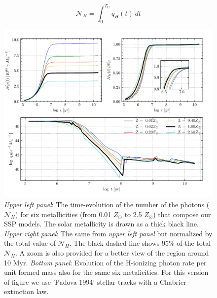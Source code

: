 \documentclass[12pt,letterpaper,usenatbib,useAMS]{article}
\begin{document}
\begin{equation}
	\mathcal{N}_H = \int_0^{T_U} q_H(t)\ dt
\end{equation}
\begin{figure}
    \includegraphics[width=\textwidth]{figs/Nh_logt_metBase_Padova1994_chab.pdf}
    \caption{\emph{Upper left panel}: The time-evolution of the number of the photons ($\mathcal{N}_H$) for six metallicities (from 0.01 $Z_\odot$ to 2.5 $Z_\odot$) that compose our SSP models. The solar metallicity is drawn as a thick black line. \emph{Upper right panel}: The same from \emph{upper left panel} but normalized by the total value of $\mathcal{N}_H$. The black dashed line shows 95\% of the total $\mathcal{N}_H$. A zoom is also provided for a better view of the region around 10 Myr. \emph{Bottom panel}: Evolution of the H-ionizing photon rate per unit formed mass also for the same six metalicities. For this version of figure we use 'Padova 1994' stellar tracks \citep{Bertelli.etal.1994} with a Chabrier extinction law.}
    \label{fig:Nh_qh_Padova1994_chab}
\end{figure}
\end{document}

